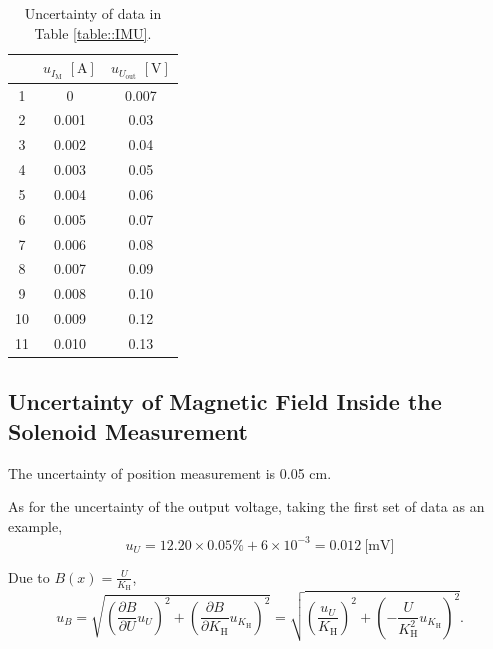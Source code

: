 \documentclass[a4paper]{article}
\begin{document}
\begin{table}[H]
	\centering
	\begin{tabular}{ccc}
		\hline
		   & $u_{I_\text{M}}\,\,[\text{A}]$ & $u_{U_{\text{out}}}\,\,[\text{V}]$ \\
		\hline
		1  & 0                              & 0.007                              \\
		2  & 0.001                          & 0.03                               \\
		3  & 0.002                          & 0.04                               \\
		4  & 0.003                          & 0.05                               \\
		5  & 0.004                          & 0.06                               \\
		6  & 0.005                          & 0.07                               \\
		7  & 0.006                          & 0.08                               \\
		8  & 0.007                          & 0.09                               \\
		9  & 0.008                          & 0.10                               \\
		10 & 0.009                          & 0.12                               \\
		11 & 0.010                          & 0.13                               \\
		\hline
	\end{tabular}
	\caption{Uncertainty of data in Table \ref{table::IMU}.}
	\label{table::uIMU}
\end{table}

\subsection{Uncertainty of Magnetic Field Inside the Solenoid Measurement}

The uncertainty of position measurement is 0.05 cm.

As for the uncertainty of the output voltage, taking the first set of data as an example,
$$u_U = 12.20 \times 0.05\% + 6\times 10^{-3} = 0.012\ \text{[mV]}$$

Due to $B(x) =\frac{U}{K_\text{H}}$,
$$ u_B = \sqrt{(\frac{\partial B}{\partial U}u_U)^2 + (\frac{\partial B}{\partial K_\text{H}}u_{K_\text{H}})^2} = \sqrt{(\frac{u_U}{K_\text{H}})^2 + (-\frac{U}{K_\text{H}^2}u_{K_\text{H}})^2}. $$
\end{document}
